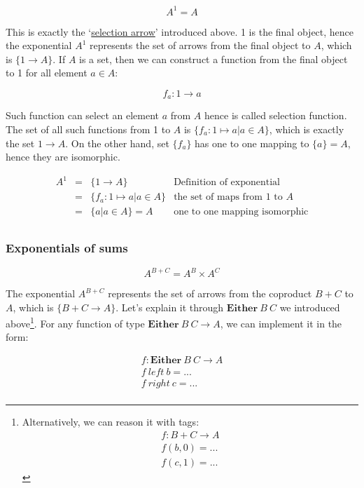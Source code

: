 \documentclass[b5paper]{article}
\begin{document}
\[
  A^1 = A
\]

This is exactly the `\hyperref[sec:selection-arrow]{selection arrow}' introduced above. 1 is the final object, hence the exponential $A^1$ represents the set of arrows from the final object to $A$, which is $\{ 1 \to A\}$. If $A$ is a set, then we can construct a function from the final object to 1 for all element $a \in A$:

\[
  f_a : 1 \to a
\]

Such function can select an element $a$ from $A$ hence is called selection function. The set of all such functions from 1 to $A$ is $\{f_a : 1 \mapsto a | a \in A\}$, which is exactly the set $1 \to A$. On the other hand, set $\{ f_a \}$ has one to one mapping to $\{a\} = A$, hence they are isomorphic.

\[
\begin{array}{rcll}
A^1 & = & \{ 1 \to A \} & \text{Definition of exponential} \\
    & = & \{ f_a : 1 \mapsto a | a \in A \} & \text{the set of maps from 1 to $A$} \\
    & = & \{ a | a \in A \} = A & \text{one to one mapping isomorphic} \\
\end{array}
\]

\subsubsection{Exponentials of sums}

\[
  A^{B + C} = A^B \times A^C
\]

The exponential $A^{B+C}$ represents the set of arrows from the coproduct $B+C$ to $A$, which is $\{B + C \to A\}$. Let's explain it through $\mathbf{Either}\ B\ C$ we introduced above\footnote{Alternatively, we can reason it with tags:
\[
\begin{array}{l}
f : B + C \to A \\
f (b, 0) = ... \\
f (c, 1) = ...
\end{array}
\]
}. For any function of type $\mathbf{Either}\ B\ C \to A$, we can implement it in the form:

\[
\begin{array}{l}
f : \mathbf{Either}\ B\ C \to A \\
f\ left\ b = ... \\
f\ right\ c = ... \\
\end{array}
\]
\end{document}
